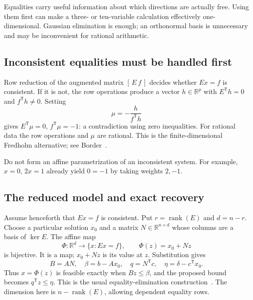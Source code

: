 \documentclass[11pt,letterpaper]{article}
\newcommand{\R}{\mathbb R}
\newcommand{\T}{\mathsf T}
\DeclareMathOperator{\rank}{rank}
\theoremstyle{definition}
\theoremstyle{remark}
\numberwithin{equation}{section}
\begin{document}
Equalities carry useful information about which directions are actually free.
Using them first can make a three- or ten-variable calculation effectively
one-dimensional. Gaussian elimination is enough; an orthonormal basis is
unnecessary and may be inconvenient for rational arithmetic.

\subsection{Inconsistent equalities must be handled first}

Row reduction of the augmented matrix \([\,E\ f\,]\) decides whether
\(Ex=f\) is consistent. If it is not, the row operations produce a vector
\(h\in\R^p\) with \(E^\T h=0\) and \(f^\T h\ne0\).
Setting
\begin{equation}\label{eq:equality-contradiction}
 \mu=-\frac{h}{f^\T h}
\end{equation}
gives \(E^\T\mu=0\), \(f^\T\mu=-1\): a contradiction using zero
inequalities. For rational data the row operations and \(\mu\) are rational.
This is the finite-dimensional Fredholm alternative; see
Border~\cite[Theorems 3--5, p.~3]{border}.

Do not form an affine parametrization of an inconsistent system. For example,
\(x=0\), \(2x=1\) already yield \(0=-1\) by taking weights \(2,-1\).

\subsection{The reduced model and exact recovery}

Assume henceforth that \(Ex=f\) is consistent. Put \(r=\rank(E)\) and
\(d=n-r\). Choose a particular solution \(x_0\) and a matrix
\(N\in\R^{n\times d}\) whose columns are a basis of \(\ker E\). The affine map
\begin{equation}\label{eq:param}
 \Phi:\R^d\longrightarrow\{x:Ex=f\},\qquad
 \Phi(z)=x_0+Nz
\end{equation}
is bijective. It is a map; \(x_0+Nz\) is its value at \(z\).
Substitution gives
\begin{equation}\label{eq:reduction}
 B=AN,\quad \beta=b-Ax_0,\quad q=N^\T c,\quad
 \eta=\delta-c^\T x_0 .
\end{equation}
Thus \(x=\Phi(z)\) is feasible exactly when \(Bz\le\beta\), and the proposed
bound becomes \(q^\T z\le\eta\). This is the usual equality-elimination
construction~\cite[slide 4.35, PDF p.~122]{boyd}. The dimension here is
\(n-\rank(E)\), allowing dependent equality rows.
\end{document}
